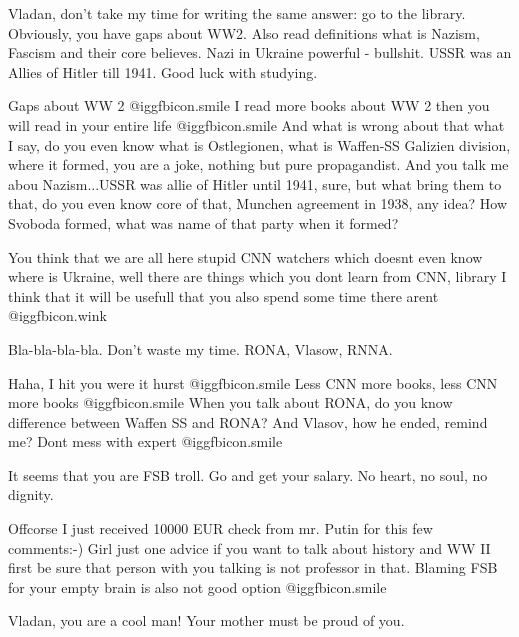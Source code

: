 \begin{itemize}
\begin{itemize}

Vladan, don't take my time for writing the same answer: go to the library.
Obviously, you have gaps about WW2. Also read definitions what is Nazism,
Fascism and their core believes. Nazi in Ukraine powerful - bullshit. USSR was
an Allies of Hitler till 1941. Good luck with studying.


Gaps about WW 2  @igg{fbicon.smile}  I read more books about WW 2 then you will read in your
entire life  @igg{fbicon.smile}  And what is wrong about that what I say, do you even know what
is Ostlegionen, what is Waffen-SS Galizien division, where it formed, you are a
joke, nothing but pure propagandist. And you talk me abou Nazism...USSR was
allie of Hitler until 1941, sure, but what bring them to that, do you even know
core of that, Munchen agreement in 1938, any idea? How Svoboda formed, what was
name of that party when it formed?



You think that we are all here stupid CNN watchers which doesnt even know where
is Ukraine, well there are things which you dont learn from CNN, library I
think that it will be usefull that you also spend some time there arent  @igg{fbicon.wink} 


Bla-bla-bla-bla. Don't waste my time. RONA, Vlasow, RNNA.


Haha, I hit you were it hurst  @igg{fbicon.smile}  Less CNN more books, less CNN more books  @igg{fbicon.smile} 
When you talk about RONA, do you know difference between Waffen SS and RONA?
And Vlasov, how he ended, remind me? Dont mess with expert  @igg{fbicon.smile} 


It seems that you are FSB troll. Go and get your salary. No heart, no soul, no
dignity.


Offcorse I just received 10000 EUR check from mr. Putin for this few
comments:-) Girl just one advice if you want to talk about history and WW II
first be sure that person with you talking is not professor in that. Blaming
FSB for your empty brain is also not good option  @igg{fbicon.smile} 

Vladan, you are a cool man! Your mother must be proud of you.


\end{itemize}
\end{itemize}
